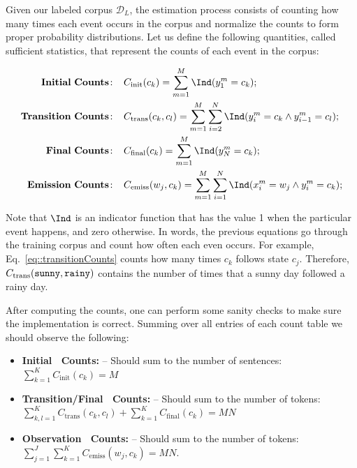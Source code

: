 Given our labeled corpus $\mathcal{D}_L$, the estimation process consists of counting how
many times each event occurs in the corpus and normalize the counts to
form proper probability distributions. Let us define the following
quantities, called sufficient statistics, that represent the counts of
each event in the corpus:

\begin{align}
\mathbf{Initial \ Counts\!:}\;\;\;\;  &  C_{\mathrm{init}}(c_k) = \sum_{m=1}^M
\Ind (y^m_1 = c_k); \label{eq::initialCounts}\\
%
%
\mathbf{Transition \ Counts\!:}\;\;\;\;  &  C_{\mathrm{trans}}(c_k,c_l) =
\sum_{m=1}^M  \sum_{i = 2}^{N}
\Ind (y^m_i = c_k \wedge y^m_{i-1} = c_l); \label{eq::transitionCounts}\\
%
\mathbf{Final \ Counts\!:}\;\;\;\;  &  C_{\mathrm{final}}(c_k) = \sum_{m=1}^M
\Ind (y^m_N = c_k); \label{eq::finalCounts}\\
%
\mathbf{Emission \ Counts\!:}\;\;\;\;  &  
C_{\mathrm{emiss}}(w_j,c_k) = \sum_{m=1}^M
\sum_{i = 1}^{N}
\Ind (x^m_i = w_j \wedge y^m_i = c_k); \label{eq::emissionCounts}
\end{align}

Note that $\Ind$ is an indicator function that has the value 1 when the
particular event happens, and zero otherwise. In words, the previous
equations go through the training corpus and count how
often each even occurs. For example, Eq.~\ref{eq::transitionCounts} counts how many times $c_k$ follows state $c_j$. Therefore, $C_{\mathrm{trans}}(\text{\tt sunny},\text{\tt rainy})$ contains the number of times that a sunny day followed a rainy day.

%


After computing the counts, one can perform some sanity checks
to make sure the implementation is correct. Summing over all entries
of each count table we should observe the following:

\begin{itemize}
\item \textbf{Initial \ Counts\!:} -- Should sum to the number of
  sentences: $\sum_{k=1}^K C_{\mathrm{init}}(c_k) = M$
\item \textbf{Transition/Final \ Counts\!:} -- Should sum to the number of
  tokens: 
  $\sum_{k,l=1}^K C_{\mathrm{trans}}(c_k,c_l) + \sum_{k=1}^K C_{\mathrm{final}}(c_k) = MN$
\item \textbf{Observation \ Counts\!:} -- Should sum to the number of tokens: $\sum_{j=1}^J\sum_{k=1}^K C_{\mathrm{emiss}}(w_j,c_k) = MN$.
\end{itemize}

